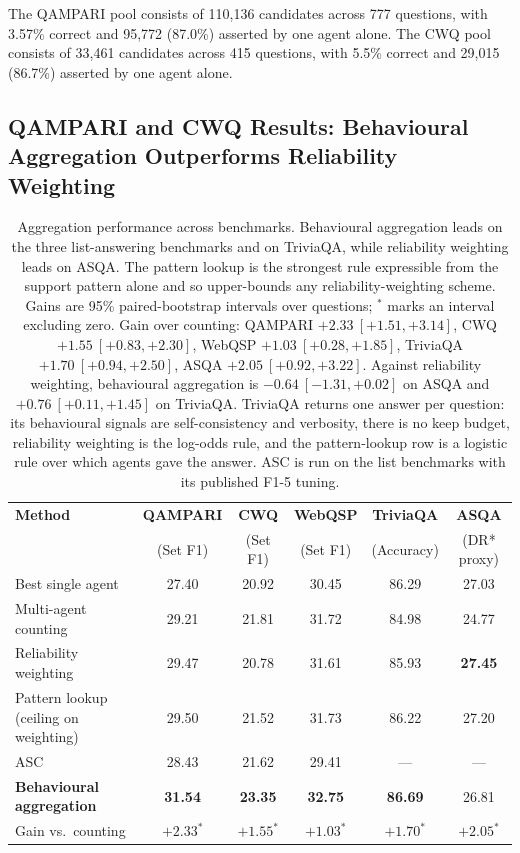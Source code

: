 \documentclass[11pt]{article}
\begin{document}
The QAMPARI pool consists of 110,136 candidates across 777 questions, with 3.57\% correct and 95,772 (87.0\%) asserted by one agent alone. The CWQ pool consists of 33,461 candidates across 415 questions, with 5.5\% correct and 29,015 (86.7\%) asserted by one agent alone.

\subsection{QAMPARI and CWQ Results: Behavioural Aggregation Outperforms Reliability Weighting}
\label{sec:rq1}

\begin{table}[t]
\centering
\caption{Aggregation performance across benchmarks. Behavioural aggregation leads on the three list-answering benchmarks and on TriviaQA, while reliability weighting leads on ASQA. The pattern lookup is the strongest rule expressible from the support pattern alone and so upper-bounds any reliability-weighting scheme. Gains are 95\% paired-bootstrap intervals over questions; $^*$ marks an interval excluding zero. Gain over counting: QAMPARI $+2.33\ [+1.51, +3.14]$, CWQ $+1.55\ [+0.83, +2.30]$, WebQSP $+1.03\ [+0.28, +1.85]$, TriviaQA $+1.70\ [+0.94, +2.50]$, ASQA $+2.05\ [+0.92, +3.22]$. Against reliability weighting, behavioural aggregation is $-0.64\ [-1.31, +0.02]$ on ASQA and $+0.76\ [+0.11, +1.45]$ on TriviaQA. TriviaQA returns one answer per question: its behavioural signals are self-consistency and verbosity, there is no keep budget, reliability weighting is the log-odds rule, and the pattern-lookup row is a logistic rule over which agents gave the answer. ASC is run on the list benchmarks with its published F1-5 tuning.}
\label{tab:main}
\begin{tabular}{lccccc}
\toprule
\textbf{Method} & \textbf{QAMPARI} & \textbf{CWQ} & \textbf{WebQSP} & \textbf{TriviaQA} & \textbf{ASQA} \\
 & (Set F1) & (Set F1) & (Set F1) & (Accuracy) & (DR* proxy) \\
\midrule
Best single agent & 27.40 & 20.92 & 30.45 & 86.29 & 27.03 \\
Multi-agent counting & 29.21 & 21.81 & 31.72 & 84.98 & 24.77 \\
Reliability weighting & 29.47 & 20.78 & 31.61 & 85.93 & \textbf{27.45} \\
Pattern lookup (ceiling on weighting) & 29.50 & 21.52 & 31.73 & 86.22 & 27.20 \\
ASC & 28.43 & 21.62 & 29.41 & --- & --- \\
\textbf{Behavioural aggregation} & \textbf{31.54} & \textbf{23.35} & \textbf{32.75} & \textbf{86.69} & 26.81 \\
\midrule
Gain vs.\ counting & $+2.33^*$ & $+1.55^*$ & $+1.03^*$ & $+1.70^*$ & $+2.05^*$ \\
\bottomrule
\end{tabular}
\end{table}
\end{document}
